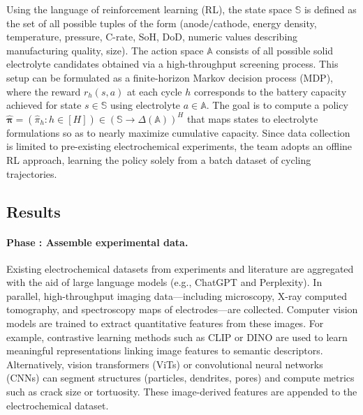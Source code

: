 Using the language of reinforcement learning (RL), the state space $\mathbb{S}$ is defined as the set of all possible tuples of the form (anode/cathode, energy density, temperature, pressure, C-rate, SoH, DoD, numeric values describing manufacturing quality, size). The action space $\mathbb{A}$ consists of all possible solid electrolyte candidates obtained via a high-throughput screening process. This setup can be formulated as a finite-horizon Markov decision process (MDP), where the reward $r_h(s,a)$ at each cycle $h$ corresponds to the battery capacity achieved for state $s \in \mathbb{S}$ using electrolyte $a \in \mathbb{A}$. The goal is to compute a policy $\hat{\boldsymbol{\pi}} = \left( \hat{\pi}_h : h \in [H] \right) \in \left( \mathbb{S} \to \Delta(\mathbb{A}) \right)^H$ that maps states to electrolyte formulations so as to nearly maximize cumulative capacity. Since data collection is limited to pre-existing electrochemical experiments, the team adopts an offline RL approach, learning the policy solely from a batch dataset of cycling trajectories.


\subsection*{Results}

\paragraph{Phase : Assemble experimental data.}
Existing electrochemical datasets from experiments and literature are aggregated with the aid of large language models (e.g., ChatGPT and Perplexity). In parallel, high-throughput imaging data—including microscopy, X-ray computed tomography, and spectroscopy maps of electrodes—are collected. Computer vision models are trained to extract quantitative features from these images. For example, contrastive learning methods such as CLIP or DINO are used to learn meaningful representations linking image features to semantic descriptors. Alternatively, vision transformers (ViTs) or convolutional neural networks (CNNs) can segment structures (particles, dendrites, pores) and compute metrics such as crack size or tortuosity. These image-derived features are appended to the electrochemical dataset.

